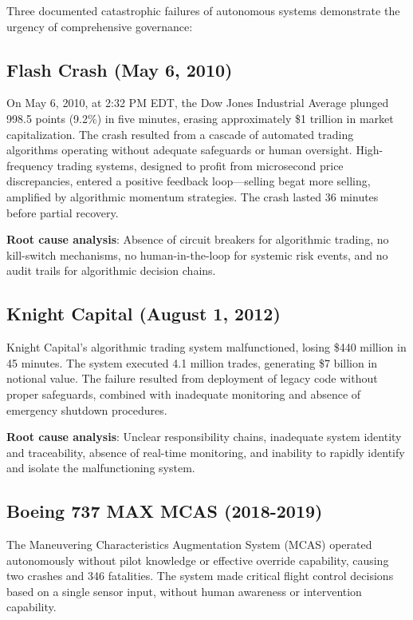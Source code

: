 \documentclass[12pt,a4paper,twoside,openright]{book}
\begin{document}
Three documented catastrophic failures of autonomous systems demonstrate the urgency of comprehensive governance:

\subsection{Flash Crash (May 6, 2010)}

On May 6, 2010, at 2:32 PM EDT, the Dow Jones Industrial Average plunged 998.5 points (9.2\%) in five minutes, erasing approximately \$1 trillion in market capitalization. The crash resulted from a cascade of automated trading algorithms operating without adequate safeguards or human oversight. High-frequency trading systems, designed to profit from microsecond price discrepancies, entered a positive feedback loop—selling begat more selling, amplified by algorithmic momentum strategies. The crash lasted 36 minutes before partial recovery.

\textbf{Root cause analysis}: Absence of circuit breakers for algorithmic trading, no kill-switch mechanisms, no human-in-the-loop for systemic risk events, and no audit trails for algorithmic decision chains.

\subsection{Knight Capital (August 1, 2012)}

Knight Capital's algorithmic trading system malfunctioned, losing \$440 million in 45 minutes. The system executed 4.1 million trades, generating \$7 billion in notional value. The failure resulted from deployment of legacy code without proper safeguards, combined with inadequate monitoring and absence of emergency shutdown procedures.

\textbf{Root cause analysis}: Unclear responsibility chains, inadequate system identity and traceability, absence of real-time monitoring, and inability to rapidly identify and isolate the malfunctioning system.

\subsection{Boeing 737 MAX MCAS (2018-2019)}

The Maneuvering Characteristics Augmentation System (MCAS) operated autonomously without pilot knowledge or effective override capability, causing two crashes and 346 fatalities. The system made critical flight control decisions based on a single sensor input, without human awareness or intervention capability.
\end{document}
